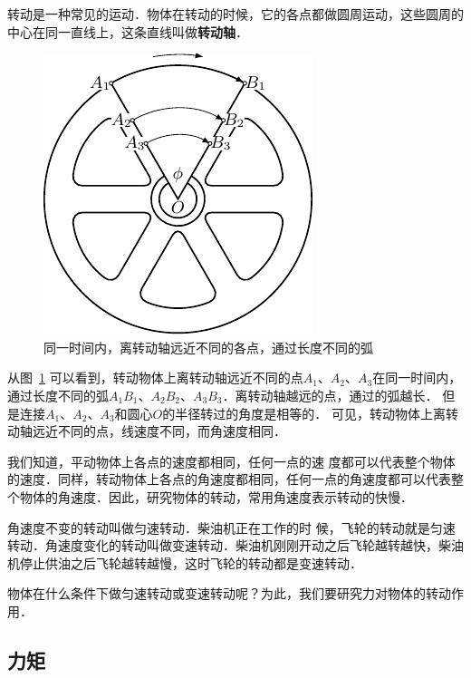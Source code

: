 转动是一种常见的运动．物体在转动的时候，它的各点都做圆周运动，这些圆周的中心在同一直线上，这条直线叫做\textbf{转动轴}．
\begin{figure}[htbp]
    \centering
    \includegraphics{fig/A/6-6.pdf}
    \caption{同一时间内，离转动轴远近不同的各点，通过长度不同的弧}\label{fig_A_6-6}
\end{figure}

从图~\ref{fig_A_6-6} 可以看到，转动物体上离转动轴远近不同的点$A_1$、$A_2$、$A_3$在同一时间内，通过长度不同的弧$A_1B_1$、$A_2B_2$、$A_3B_3$．离转动轴越远的点，通过的弧越长．
但是连接$A_1$、$A_2$、$A_3$和圆心$O$的半径转过的角度是相等的．
可见，转动物体上离转动轴远近不同的点，线速度不同，而角速度相同．

我们知道，平动物体上各点的速度都相同，任何一点的速
度都可以代表整个物体的速度．同样，转动物体上各点的角速度都相同，任何一点的角速度都可以代表整个物体的角速度．因此，研究物体的转动，常用角速度表示转动的快慢．

角速度不变的转动叫做匀速转动．柴油机正在工作的时
候，飞轮的转动就是匀速转动．角速度变化的转动叫做变速转动．柴油机刚刚开动之后飞轮越转越快，柴油机停止供油之后飞轮越转越慢，这时飞轮的转动都是变速转动．

物体在什么条件下做匀速转动或变速转动呢？为此，我们要研究力对物体的转动作用．



\subsection{力矩} 

